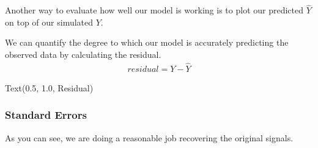 \documentclass[letterpaper,10pt,english]{sphinxmanual}
\begin{document}
Another way to evaluate how well our model is working is to plot our predicted \(\hat Y\) on top of our simulated \(Y\).

We can quantify the degree to which our model is accurately predicting the observed data by calculating the residual.
\begin{equation*}
\begin{split}residual = Y - \hat Y\end{split}
\end{equation*}
\begin{sphinxVerbatim}[commandchars=\\\{\}]
   

  \PYG{p}{[} \PYG{p}{]}

 \PYG{p}{[} \PYG{p}{]}

    

 
\end{sphinxVerbatim}

\begin{sphinxVerbatim}[commandchars=\\\{\}]
Text(0.5, 1.0, \PYGZsq{}Residual\PYGZsq{})
\end{sphinxVerbatim}

\noindent{}

\noindent{}


\subsubsection{Standard Errors}
\label{\detokenize{content/GLM:standard-errors}}
As you can see, we are doing a reasonable job recovering the original signals.
\end{document}
